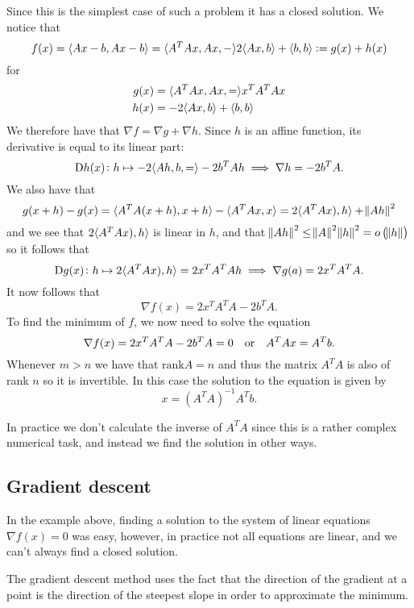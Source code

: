 \documentclass[11pt,a4paper]{article}
\begin{document}
Since this is the simplest case of such a problem it has a closed solution.
We notice that
\[
  f(x) = \langle Ax - b, Ax - b \rangle =
  \langle A^T Ax, Ax, - \rangle 2 \langle Ax, b \rangle + \langle b, b \rangle :=
  g(x) + h(x)
\]
for
\begin{align*}
  g(x) &= \langle A^T Ax, Ax, = \rangle x^T A^T A x \\
  h(x) &= - 2 \langle Ax, b \rangle + \langle b, b \rangle
\end{align*}
We therefore have that $\nabla f = \nabla g + \nabla h$.
Since $h$ is an affine function, its derivative is equal to its linear part:
\[
  \Dif h(x) \colon h \mapsto - 2 \ip{Ah, b} = - 2 b^T A h \implies
  \nabla h = - 2 b^T A.
\]
We also have that
\[
  g(x + h) - g(x) = \langle A^T A (x + h), x + h \rangle - \langle A^T A x, x \rangle =
  2 \langle A^T A x), h \rangle + \norm{A h}^2
\]
and we see that $2 \langle A^T A x), h \rangle$ is linear in $h$, and that
$\norm{A h}^2 \le \norm{A}^2 \norm{h}^2 = o\del{\norm h}$ so it follows
that
\[
  \Dif g(x) \colon h \mapsto 2 \ip{A^T A x)}{h} = 2 x^T A^T A h \implies
  \nabla g(a) = 2 x^T A^T A.
\]
It now follows that
\[
  \nabla f(x) = 2 x^T A^T A - 2 b^T A.
\]
To find the minimum of $f$, we now need to solve the equation
\[
  \nabla f(x) = 2 x^T A^T A - 2 b^T A = 0 \quad \text{or} \quad
  A^T A x = A^T b.
\]
Whenever $m > n$ we have that $\mathrm{rank} A = n$ and thus the matrix 
$A^T A$ is also of rank $n$ so it is invertible.
In this case the solution to the equation is given by
\[
  x = (A^T A)^{-1} A^T b.
\]
\begin{remark}
  In practice we don't calculate the inverse of $A^T A$ since this is a rather
  complex numerical task, and instead we find the solution in other ways.
\end{remark}

\subsection{Gradient descent}
In the example above, finding a solution to the system of linear equations
$\nabla f(x) = 0$ was easy, however, in practice not all equations are linear,
and we can't always find a closed solution.

The gradient descent method uses the fact that the direction of the gradient
at a point is the direction of the steepest slope in order to approximate
the minimum.
\end{document}
